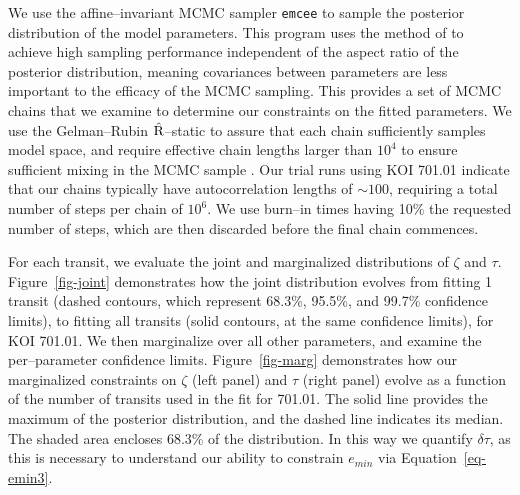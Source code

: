 We use the affine--invariant MCMC sampler {\tt emcee}
\citep{2013PASP..125..306F} to sample the posterior distribution of
the model parameters.  This program uses the method of
\cite{Goodman-Weare} to achieve high sampling performance independent
of the aspect ratio of the posterior distribution, meaning covariances
between parameters are less important to the efficacy of the MCMC
sampling.  This provides a set of MCMC chains that we examine to
determine our constraints on the fitted parameters.  We use the
Gelman--Rubin $\hat{\rm R}$--static \citep{Gelman92} to assure that
each chain sufficiently samples model space, and require effective
chain lengths larger than $10^4$ to ensure sufficient mixing in the
MCMC sample \cite[e.g.][]{2004PhRvD..69j3501T}.  Our trial runs using
KOI 701.01 indicate that our chains typically have autocorrelation
lengths of $\sim 100$, requiring a total number of steps per chain of
$10^6$.  We use burn--in times having 10\% the requested number of
steps, which are then discarded before the final chain commences.

For each transit, we evaluate the joint and marginalized distributions
of $\zeta$ and $\tau$.  Figure~\ref{fig-joint} demonstrates how the
joint distribution evolves from fitting 1 transit (dashed contours,
which represent 68.3\%, 95.5\%, and 99.7\% confidence limits), to
fitting all transits (solid contours, at the same confidence limits),
for KOI 701.01.  We then marginalize over all other parameters, and
examine the per--parameter confidence limits.  Figure~\ref{fig-marg}
demonstrates how our marginalized constraints on $\zeta$ (left panel)
and $\tau$ (right panel) evolve as a function of the number of
transits used in the fit for 701.01.  The solid line provides the
maximum of the posterior distribution, and the dashed line indicates
its median.  The shaded area encloses 68.3\% of the distribution.  In
this way we quantify $\delta \tau$, as this is necessary to understand
our ability to constrain $e_{min}$ via Equation~\ref{eq-emin3}.

